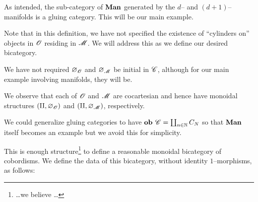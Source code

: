 \documentclass[./Thick_TQFTs_and_Quantum_Information.tex]{subfiles}
\begin{document}
\begin{exm}
As intended, the sub-category of $\textbf{Man}$ generated by the $d$-- and
$(d + 1)$--manifolds is a gluing category. This will be our main example.
\end{exm}

\begin{rmk}
Note that in this definition, we have not specified the existence of
``cylinders on'' objects in $\mathscr{O}$ residing in $\mathscr{M}$. We will address this as
we define our desired bicategory.
\end{rmk}

\begin{rmk}
We have not required $\varnothing_{\mathscr{O}}$ and $\varnothing_{\mathscr{M}}$ be initial
in $\mathscr{C}$, although for our main example involving manifolds, they will be.
\end{rmk}

\begin{rmk}
We observe that each of $\mathscr{O}$ and $\mathscr{M}$ are cocartesian and hence have
monoidal structures $(\amalg, \varnothing_{\mathscr{O}})$ and
$(\amalg, \varnothing_{\mathscr{M}})$, respectively.
\end{rmk}

\begin{rmk}
We could generalize gluing categories to have
$\textbf{ob } \mathscr{C} = \coprod_{n \in \mathbb{N}} C_N$ so that $\textbf{Man}$ itself becomes an example
but we avoid this for simplicity.
\end{rmk}

This is enough structure\footnote{\dots we believe \dots} to define a reasonable
monoidal bicategory of cobordisms. We define the data of this bicategory,
without identity $1$--morphisms, as follows:
\end{document}
